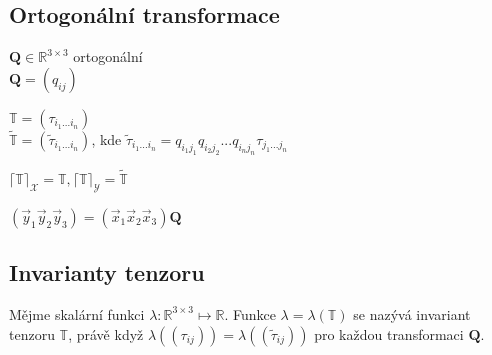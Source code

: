 \documentclass[../main.tex]{subfiles}
\begin{document}
\subsection{Ortogonální transformace}

$\mathbf{Q} \in \mathbb{R}^{3\times 3}$ ortogonální\\
$\mathbf{Q} = (q_{ij})$

$\mathbb{T} = (\tau_{i_1...i_n})$\\
$\tilde{\mathbb{T}} = (\tilde{\tau}_{i_1...i_n})$, kde $\tilde{\tau}_{i_1...i_n} = q_{i_1j_1}q_{i_2j_2}...q_{i_nj_n}\tau_{j_1...j_n}$ 

$\lceil \mathbb{T} \rceil_{\mathcal{X}} = \mathbb{T}, \lceil \mathbb{T} \rceil_{\mathcal{Y}} = \tilde{\mathbb{T}}$

$(\vec{y}_1 \vec{y}_2 \vec{y}_3) = (\vec{x}_1 \vec{x}_2 \vec{x}_3 ) \mathbf{Q}$

\subsection{Invarianty tenzoru}
\begin{definition}
    Mějme skalární funkci $\lambda: \mathbb{R}^{3\times 3} \mapsto \mathbb{R}$.
    Funkce $\lambda = \lambda(\mathbb{T})$ se nazývá invariant tenzoru $\mathbb{T}$, právě když
    $\lambda((\tau_{ij}) ) = \lambda((\tilde{\tau}_{ij}))$ pro každou transformaci $\mathbf{Q}$.
\end{definition}
\end{document}
